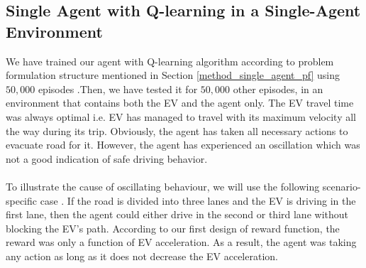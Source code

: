 \subsection{Single Agent with Q-learning in a Single-Agent Environment}
\label{single_agent_results}
We have trained our agent with Q-learning algorithm according to problem formulation structure mentioned in Section \ref{method_single_agent_pf} using $ 50,000$ episodes .Then, we have tested it  for $ 50,000 $ other episodes, in an environment that contains both the EV and the agent  only. The EV travel time was always optimal i.e. EV has managed to travel with its maximum velocity all the way during its trip. Obviously, the agent has taken all necessary actions to evacuate road for it. However, the agent has experienced an oscillation which was not a good indication of safe driving behavior. \\ \\ 
To illustrate the cause of oscillating behaviour, we will use the following scenario-specific case . If the road is divided into three lanes and the EV is driving in the first lane, then the agent could either drive in the second or third lane  without blocking the EV's path. According to our first design of reward function, the reward was only a function of EV acceleration. As a result, the agent was taking any action as long as it does not decrease the EV acceleration.\\ 

